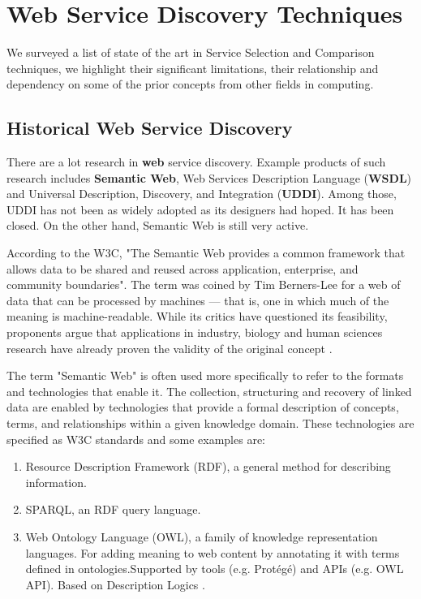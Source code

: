 \section{Web Service Discovery Techniques}
\label{sec:WebServiceDiscoveryTechniques}
We surveyed a list of state of the art in Service Selection and Comparison techniques, we highlight their significant limitations, their relationship and dependency on some of the prior concepts from other fields in computing. 

\subsection{Historical Web Service Discovery}
There are a lot research in \textbf{web} service discovery. Example products of such research includes \textbf{Semantic Web},  Web Services Description Language (\textbf{WSDL}) and Universal Description, Discovery, and Integration (\textbf{UDDI}). Among those, UDDI has not been as widely adopted as its designers had hoped. It has been closed. On the other hand, Semantic Web is still very active. 

According to the W3C, "The Semantic Web provides a common framework that allows data to be shared and reused across application, enterprise, and community boundaries". The term was coined by Tim Berners-Lee for a web of data that can be processed by machines — that is, one in which much of the meaning is machine-readable. While its critics have questioned its feasibility, proponents argue that applications in industry, biology and human sciences research have already proven the validity of the original concept \cite{SemanticWeb}.

The term "Semantic Web" is often used more specifically to refer to the formats and technologies that enable it. The collection, structuring and recovery of linked data are enabled by technologies that provide a formal description of concepts, terms, and relationships within a given knowledge domain. These technologies are specified as W3C standards and some examples are:

\begin{enumerate}
    \item 
    Resource Description Framework (RDF), a general method for describing information.
    \item
    SPARQL, an RDF query language.
    \item
    Web Ontology Language (OWL), a family of knowledge representation languages. For adding meaning to web content by annotating it with terms defined in ontologies.Supported by tools (e.g. Protégé) and APIs (e.g. OWL API). Based on Description Logics \cite{OntologyLanguageTool2}.
\end{enumerate}

